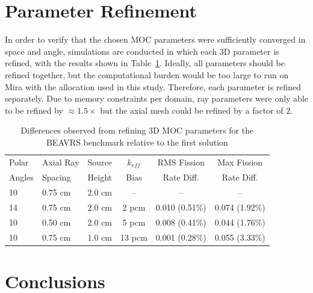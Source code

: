 \section{Parameter Refinement}
\label{sec:fc-parameter-refinement}

In order to verify that the chosen \ac{MOC} parameters were sufficiently converged in space and angle, simulations are conducted in which each 3D parameter is refined, with the results shown in Table~\ref{tab:fc-param-sensitivity}. Ideally, all parameters should be refined together, but the computational burden would be too large to run on Mira with the allocation used in this study. Therefore, each parameter is refined separately. Due to memory constraints per domain, ray parameters were only able to be refined by $\approx 1.5 \times$ but the axial mesh could be refined by a factor of 2. 


\begin{table}[ht]
	\centering
	\caption{Differences observed from refining 3D MOC parameters for the BEAVRS benchmark relative to the first solution}
	\medskip
	\begin{tabular}{l|l|l|c|c|c}
		\hline
		Polar  & Axial Ray & Source & $k_{\textit{eff}}$  & \ac{RMS} Fission & Max Fission \\
		Angles & Spacing   & Height & Bias                & Rate Diff. & Rate Diff. \\
		\hline
		10 & 0.75 cm & 2.0 cm & --     & --     & --  \\
		14 & 0.75 cm & 2.0 cm & 2 pcm  & 0.010 (0.51\%) & 0.074 (1.92\%)  \\
		10 & 0.50 cm & 2.0 cm & 5 pcm  & 0.008 (0.41\%) & 0.044 (1.76\%) \\
		10 & 0.75 cm & 1.0 cm & 13 pcm & 0.001 (0.28\%) & 0.055 (3.33\%)  \\
		\hline
	\end{tabular}
	\label{tab:fc-param-sensitivity}
\end{table}

\section{Conclusions}
\label{sec:fc-conclusion}

